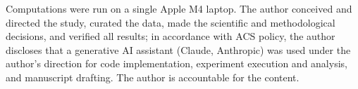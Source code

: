 \documentclass[journal=jcisd8,manuscript=article]{achemso}
\begin{document}
\begin{acknowledgement}
Computations were run on a single Apple M4 laptop. The author conceived and directed
the study, curated the data, made the scientific and methodological decisions, and
verified all results; in accordance with ACS policy, the author discloses that a
generative AI assistant (Claude, Anthropic) was used under the author's direction for
code implementation, experiment execution and analysis, and manuscript drafting. The
author is accountable for the content.
\end{acknowledgement}


\end{document}
